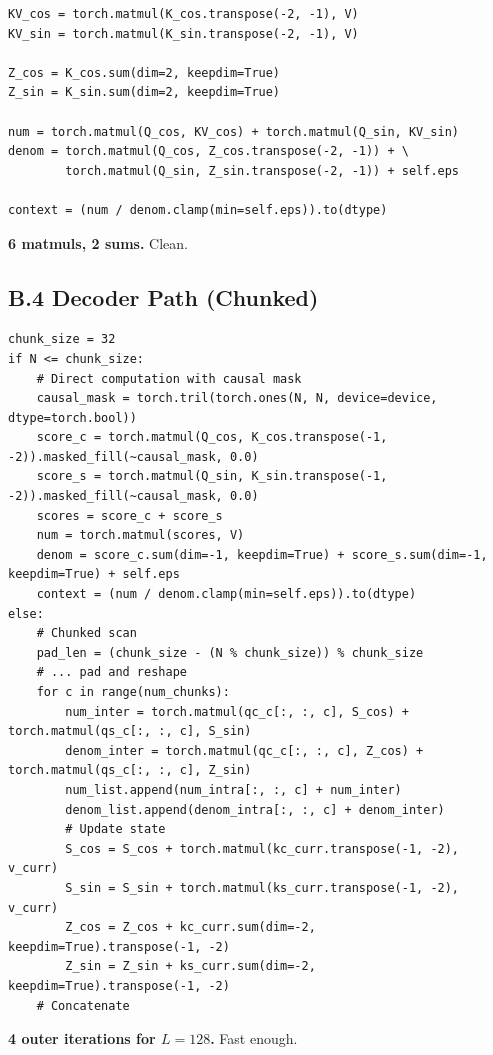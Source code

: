 \begin{lstlisting}
KV_cos = torch.matmul(K_cos.transpose(-2, -1), V)
KV_sin = torch.matmul(K_sin.transpose(-2, -1), V)

Z_cos = K_cos.sum(dim=2, keepdim=True)
Z_sin = K_sin.sum(dim=2, keepdim=True)

num = torch.matmul(Q_cos, KV_cos) + torch.matmul(Q_sin, KV_sin)
denom = torch.matmul(Q_cos, Z_cos.transpose(-2, -1)) + \
        torch.matmul(Q_sin, Z_sin.transpose(-2, -1)) + self.eps

context = (num / denom.clamp(min=self.eps)).to(dtype)
\end{lstlisting}

\textbf{6 matmuls, 2 sums.} Clean.

\subsection{B.4 Decoder Path (Chunked)}

\begin{lstlisting}
chunk_size = 32
if N <= chunk_size:
    # Direct computation with causal mask
    causal_mask = torch.tril(torch.ones(N, N, device=device, dtype=torch.bool))
    score_c = torch.matmul(Q_cos, K_cos.transpose(-1, -2)).masked_fill(~causal_mask, 0.0)
    score_s = torch.matmul(Q_sin, K_sin.transpose(-1, -2)).masked_fill(~causal_mask, 0.0)
    scores = score_c + score_s
    num = torch.matmul(scores, V)
    denom = score_c.sum(dim=-1, keepdim=True) + score_s.sum(dim=-1, keepdim=True) + self.eps
    context = (num / denom.clamp(min=self.eps)).to(dtype)
else:
    # Chunked scan
    pad_len = (chunk_size - (N % chunk_size)) % chunk_size
    # ... pad and reshape
    for c in range(num_chunks):
        num_inter = torch.matmul(qc_c[:, :, c], S_cos) + torch.matmul(qs_c[:, :, c], S_sin)
        denom_inter = torch.matmul(qc_c[:, :, c], Z_cos) + torch.matmul(qs_c[:, :, c], Z_sin)
        num_list.append(num_intra[:, :, c] + num_inter)
        denom_list.append(denom_intra[:, :, c] + denom_inter)
        # Update state
        S_cos = S_cos + torch.matmul(kc_curr.transpose(-1, -2), v_curr)
        S_sin = S_sin + torch.matmul(ks_curr.transpose(-1, -2), v_curr)
        Z_cos = Z_cos + kc_curr.sum(dim=-2, keepdim=True).transpose(-1, -2)
        Z_sin = Z_sin + ks_curr.sum(dim=-2, keepdim=True).transpose(-1, -2)
    # Concatenate
\end{lstlisting}

\textbf{4 outer iterations for $L = 128$.} Fast enough.

